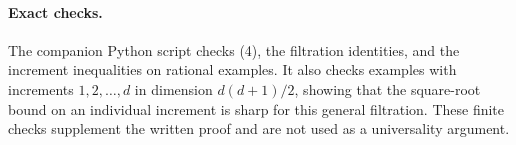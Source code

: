 \documentclass[11pt]{article}
\begin{document}
\paragraph{Exact checks.}
The companion Python script checks (4), the filtration identities,
and the increment inequalities on rational examples. It also checks
examples with increments $1,2,\ldots,d$ in dimension $d(d+1)/2$,
showing that the square-root bound on an individual increment is
sharp for this general filtration. These finite checks supplement
the written proof and are not used as a universality argument.
\end{document}
